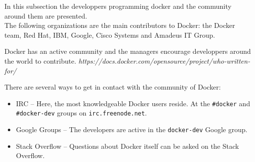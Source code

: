 
In this subsection the developpers programming docker and the community around them are presented. \\

The following organizations are the main contributors to Docker: the Docker team, Red Hat, IBM, Google, Cisco Systems and Amadeus IT Group. 

Docker has an active community and the managers encourage developpers around the world to contribute. 
\textit{https://docs.docker.com/opensource/project/who-written-for/}

There are several ways to get in contact with the community of Docker:
\begin{itemize}
\item IRC -- Here, the most knowledgeable Docker users reside. At the \verb|#docker| and \verb|#docker-dev| groups on \verb|irc.freenode.net|.

\item Google Groups -- The developers are active in the \verb|docker-dev| Google group.

\item Stack Overflow -- Questions about Docker itself can be asked on the Stack Overflow. 

\end{itemize}

